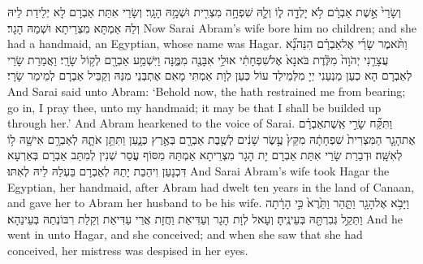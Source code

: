 \newperek
{}
{וְשָׂרַי֙ אֵ֣שֶׁת אַבְרָ֔ם לֹ֥א יָלְדָ֖ה ל֑וֹ וְלָ֛הּ שִׁפְחָ֥ה מִצְרִ֖ית וּשְׁמָ֥הּ הָגָֽר׃}
{וְשָׂרַי אִתַּת אַבְרָם לָא יְלֵידַת לֵיהּ וְלַהּ אַמְתָּא מִצְרֵיתָא וּשְׁמַהּ הָגָר׃}
{Now Sarai Abram’s wife bore him no children; and she had a handmaid, an Egyptian, whose name was Hagar.}{}
{וַתֹּ֨אמֶר שָׂרַ֜י אֶל\maqqaf אַבְרָ֗ם הִנֵּה\maqqaf נָ֞א עֲצָרַ֤נִי יְהֹוָה֙ מִלֶּ֔דֶת בֹּא\maqqaf נָא֙ אֶל\maqqaf שִׁפְחָתִ֔י אוּלַ֥י אִבָּנֶ֖ה מִמֶּ֑נָּה וַיִּשְׁמַ֥ע אַבְרָ֖ם לְק֥וֹל שָׂרָֽי׃}
{וַאֲמַרַת שָׂרַי לְאַבְרָם הָא כְעַן מַנְעַנִי יְיָ מִלְּמֵילַד עוֹל כְּעַן לְוָת אַמְתִּי מָאִם אֶתְבְּנֵי מִנַּהּ וְקַבֵּיל אַבְרָם לְמֵימַר שָׂרָי׃}
{And Sarai said unto Abram: ‘Behold now, the \lord\space hath restrained me from bearing; go in, I pray thee, unto my handmaid; it may be that I shall be builded up through her.’ And Abram hearkened to the voice of Sarai.}{}
{וַתִּקַּ֞ח שָׂרַ֣י אֵֽשֶׁת\maqqaf אַבְרָ֗ם אֶת\maqqaf הָגָ֤ר הַמִּצְרִית֙ שִׁפְחָתָ֔הּ מִקֵּץ֙ עֶ֣שֶׂר שָׁנִ֔ים לְשֶׁ֥בֶת אַבְרָ֖ם בְּאֶ֣רֶץ כְּנָ֑עַן וַתִּתֵּ֥ן אֹתָ֛הּ לְאַבְרָ֥ם אִישָׁ֖הּ ל֥וֹ לְאִשָּֽׁה׃}
{וּדְבַרַת שָׂרַי אִתַּת אַבְרָם יָת הָגָר מִצְרֵיתָא אַמְתַּהּ מִסּוֹף עֲסַר שְׁנִין לְמִתַּב אַבְרָם בְּאַרְעָא דִּכְנָעַן וִיהַבַת יָתַהּ לְאַבְרָם בַּעְלַהּ לֵיהּ לְאִתּוּ׃}
{And Sarai Abram’s wife took Hagar the Egyptian, her handmaid, after Abram had dwelt ten years in the land of Canaan, and gave her to Abram her husband to be his wife.}{}
{וַיָּבֹ֥א אֶל\maqqaf הָגָ֖ר וַתַּ֑הַר וַתֵּ֙רֶא֙ כִּ֣י הָרָ֔תָה וַתֵּקַ֥ל גְּבִרְתָּ֖הּ בְּעֵינֶֽיהָ׃}
{וְעָאל לְוָת הָגָר וְעַדִּיאַת וַחֲזָת אֲרֵי עַדִּיאַת וְקַלַת רִבּוֹנְתַהּ בְּעֵינַהָא׃}
{And he went in unto Hagar, and she conceived; and when she saw that she had conceived, her mistress was despised in her eyes.}{}
